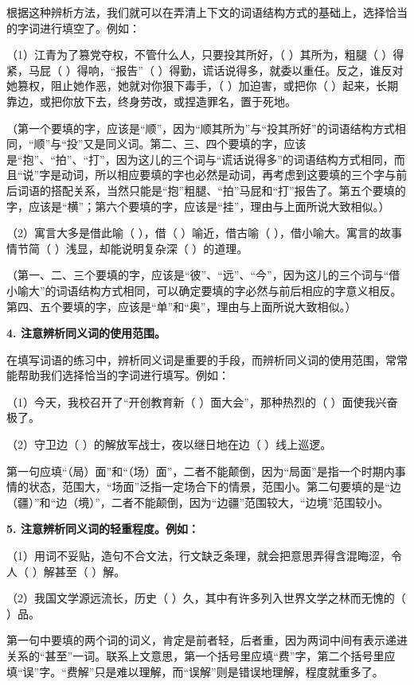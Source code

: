 根据这种辨析方法，我们就可以在弄清上下文的词语结构方式的基础上，选择恰当的字词进行填空了。例如：

（1）江青为了篡党夺权，不管什么人，只要投其所好，（ ）其所为，粗腿（ ）得紧，马屁（ ）得响，“报告”（ ）得勤，谎话说得多，就委以重任。反之，谁反对她篡权，阻止她作恶，她就对你狠下毒手，（ ）加迫害，或把你（ ）起来，长期靠边，或把你放下去，终身劳改，或捏造罪名，置于死地。

（第一个要填的字，应该是“顺”，因为“顺其所为”与“投其所好”的词语结构方式相同，“顺”与“投”又是同义词。第二、三、四个要填的字，应该是“抱”、“拍”、“打”，因为这儿的三个词与“谎话说得多”的词语结构方式相同，而且“说”字是动词，所以相应要填的字也必然是动词，再考虑到这要填的三个字与前后词语的搭配关系，当然只能是“抱”粗腿、“拍”马屁和“打”报告了。第五个要填的字，应该是“横”；第六个要填的字，应该是“挂”，理由与上面所说大致相似。）

（2）寓言大多是借此喻（ ），借（ ）喻近，借古喻（ ），借小喻大。寓言的故事情节简（ ）浅显，却能说明复杂深（ ）的道理。

（第一、二、三个要填的字，应该是“彼”、“远”、“今”，因为这儿的三个词与“借小喻大”的词语结构方式相同，可以确定要填的字必然与前后相应的字意义相反。第四、五个要填的字，应该是“单”和“奥”，理由与上面所说大致相似。）

\textbf{4. 注意辨析同义词的使用范围。}

在填写词语的练习中，辨析同义词是重要的手段，而辨析同义词的使用范围，常常能帮助我们选择恰当的字词进行填写。例如：

（1）今天，我校召开了“开创教育新（ ）面大会”，那种热烈的（ ）面使我兴奋极了。

（2）守卫边（ ）的解放军战士，夜以继日地在边（ ）线上巡逻。

第一句应填“（局）面”和“（场）面”，二者不能颠倒，因为“局面”是指一个时期内事情的状态，范围大，“场面”泛指一定场合下的情景，范围小。第二句要填的是“边（疆）”和“边（境）”，二者不能颠倒，因为“边疆”范围较大，“边境”范围较小。

\textbf{5. 注意辨析同义词的轻重程度。例如：}

（1）用词不妥贴，造句不合文法，行文缺乏条理，就会把意思弄得含混晦涩，令人（ ）解甚至（ ）解。

（2）我国文学源远流长，历史（ ）久，其中有许多列入世界文学之林而无愧的（ ）品。

第一句中要填的两个词的词义，肯定是前者轻，后者重，因为两词中间有表示递进关系的“甚至”一词。联系上文意思，第一个括号里应填“费”字，第二个括号里应填“误”字。“费解”只是难以理解，而“误解”则是错误地理解，程度就重多了。

